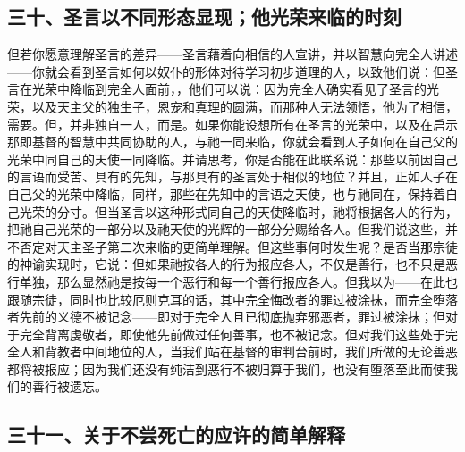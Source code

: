 
\subsection{三十、圣言以不同形态显现；他光荣来临的时刻}

但若你愿意理解圣言的差异——圣言藉着向相信的人宣讲，并以智慧向完全人讲述——你就会看到圣言如何以奴仆的形体对待学习初步道理的人，以致他们说：但圣言在光荣中降临到完全人面前，，他们可以说：因为完全人确实看见了圣言的光荣，以及天主父的独生子，恩宠和真理的圆满，而那种人无法领悟，他为了相信，需要。但，并非独自一人，而是。如果你能设想所有在圣言的光荣中，以及在启示那即基督的智慧中共同协助的人，与祂一同来临，你就会看到人子如何在自己父的光荣中同自己的天使一同降临。并请思考，你是否能在此联系说：那些以前因自己的言语而受苦、具有的先知，与那具有的圣言处于相似的地位？并且，正如人子在自己父的光荣中降临，同样，那些在先知中的言语之天使，也与祂同在，保持着自己光荣的分寸。但当圣言以这种形式同自己的天使降临时，祂将根据各人的行为，把祂自己光荣的一部分以及祂天使的光辉的一部分分赐给各人。但我们说这些，并不否定对天主圣子第二次来临的更简单理解。但这些事何时发生呢？是否当那宗徒的神谕实现时，它说：但如果祂按各人的行为报应各人，不仅是善行，也不只是恶行单独，那么显然祂是按每一个恶行和每一个善行报应各人。但我以为——在此也跟随宗徒，同时也比较厄则克耳的话，其中完全悔改者的罪过被涂抹，而完全堕落者先前的义德不被记念——即对于完全人且已彻底抛弃邪恶者，罪过被涂抹；但对于完全背离虔敬者，即使他先前做过任何善事，也不被记念。但对我们这些处于完全人和背教者中间地位的人，当我们站在基督的审判台前时，我们所做的无论善恶都将被报应；因为我们还没有纯洁到恶行不被归算于我们，也没有堕落至此而使我们的善行被遗忘。\par


\subsection{三十一、关于不尝死亡的应许的简单解释}

